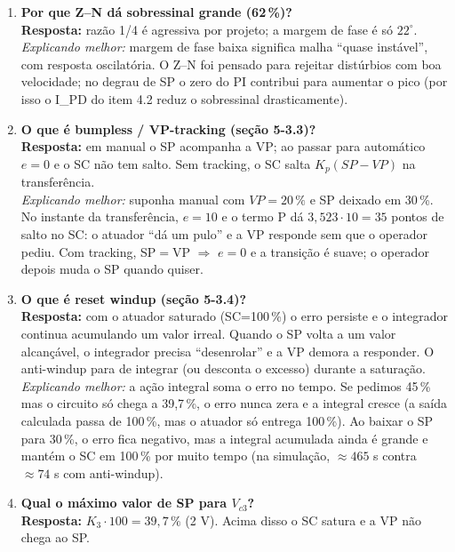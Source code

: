 \documentclass[11pt,a4paper]{article}
\newcommand{\Vc}[1]{V_{c#1}}
\begin{document}
\begin{enumerate}[leftmargin=*]
\emph{Explicando melhor:} é um compromisso empírico: rápido (sobe logo) com oscilação que se extingue em poucos ciclos. Não é o ``mais suave'', é o critério clássico do Ziegler--Nichols.
\item \textbf{Por que Z--N dá sobressinal grande (62\,\%)?}\\
\textbf{Resposta:} razão 1/4 é agressiva por projeto; a margem de fase é só $22^\circ$.\\
\emph{Explicando melhor:} margem de fase baixa significa malha ``quase instável'', com resposta oscilatória. O Z--N foi pensado para rejeitar distúrbios com boa velocidade; no degrau de SP o zero do PI contribui para aumentar o pico (por isso o I\_PD do item 4.2 reduz o sobressinal drasticamente).
\item \textbf{O que é bumpless / VP-tracking (seção 5-3.3)?}\\
\textbf{Resposta:} em manual o SP acompanha a VP; ao passar para automático $e=0$ e o SC não tem salto. Sem tracking, o SC salta $K_p(SP-VP)$ na transferência.\\
\emph{Explicando melhor:} suponha manual com $VP=20\,\%$ e SP deixado em 30\,\%. No instante da transferência, $e=10$ e o termo P dá $3{,}523\cdot10=35$ pontos de salto no SC: o atuador ``dá um pulo'' e a VP responde sem que o operador pediu. Com tracking, SP$=$VP $\Rightarrow$ $e=0$ e a transição é suave; o operador depois muda o SP quando quiser.
\item \textbf{O que é reset windup (seção 5-3.4)?}\\
\textbf{Resposta:} com o atuador saturado (SC=100\,\%) o erro persiste e o integrador continua acumulando um valor irreal. Quando o SP volta a um valor alcançável, o integrador precisa ``desenrolar'' e a VP demora a responder. O anti-windup para de integrar (ou desconta o excesso) durante a saturação.\\
\emph{Explicando melhor:} a ação integral soma o erro no tempo. Se pedimos 45\,\% mas o circuito só chega a 39,7\,\%, o erro nunca zera e a integral cresce (a saída calculada passa de 100\,\%, mas o atuador só entrega 100\,\%). Ao baixar o SP para 30\,\%, o erro fica negativo, mas a integral acumulada ainda é grande e mantém o SC em 100\,\% por muito tempo (na simulação, $\approx465$ s contra $\approx74$ s com anti-windup).
\item \textbf{Qual o máximo valor de SP para $\Vc3$?}\\
\textbf{Resposta:} $K_3\cdot100=39{,}7\,\%$ (2 V). Acima disso o SC satura e a VP não chega ao SP.\\

\end{enumerate}
\end{document}
